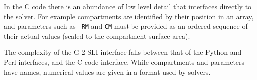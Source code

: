 \documentclass[12pt]{article}
\begin{document}
In the C code there is an abundance of low level detail that
interfaces directly to the solver.  For example compartments are
identified by their position in an array, and parameters such as {\tt
  RM} and {\tt CM} must be provided as an ordered sequence of their
actual values (scaled to the compartment surface area).

The complexity of the G-2 SLI interface falls between that of the
Python and Perl interfaces, and the C code interface.  While
compartments and parameters have names, numerical values are given in
a format used by solvers.

    










\end{document}
